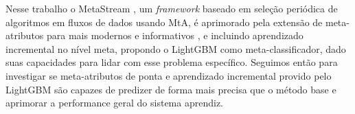 Nesse trabalho o MetaStream \cite{rossi2012, rossi2014metastream}, um \textit{framework} baseado em seleção periódica de algoritmos em fluxos de dados usando MtA, é aprimorado pela extensão de meta-atributos para mais modernos e informativos \cite{Rivolli2018}, e incluindo aprendizado incremental no nível meta, propondo o  LightGBM \cite{ke2017lightgbm} como meta-classificador, dado suas capacidades para lidar com esse problema específico. Seguimos então para investigar se meta-atributos de ponta e aprendizado incremental provido pelo LightGBM são capazes de predizer de forma mais precisa que o método base e aprimorar a performance geral do sistema aprendiz.
